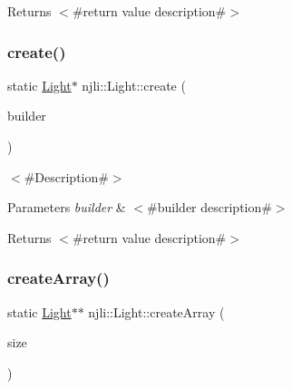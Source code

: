 \begin{DoxyReturn}{Returns}
$<$\#return value description\#$>$ 
\end{DoxyReturn}
\mbox{\label{classnjli_1_1_light_a9f63fa25bf0911636398d7b0d9d91a2f}} 
\subsubsection{\texorpdfstring{create()}{create()}\hspace{0.1cm}{\footnotesize\ttfamily [3/3]}}
{\footnotesize\ttfamily static \mbox{\hyperlink{classnjli_1_1_light}{Light}}$\ast$ njli\+::\+Light\+::create (\begin{DoxyParamCaption}\item[{const \mbox{\hyperlink{classnjli_1_1_light_builder}{Light\+Builder}} \&}]{builder }\end{DoxyParamCaption})\hspace{0.3cm}{\ttfamily [static]}}

$<$\#\+Description\#$>$


\begin{DoxyParams}{Parameters}
{\em builder} & $<$\#builder description\#$>$\\
\hline
\end{DoxyParams}
\begin{DoxyReturn}{Returns}
$<$\#return value description\#$>$ 
\end{DoxyReturn}
\mbox{\label{classnjli_1_1_light_af5480d5e20cc23e6b6396682933b8f7b}} 
\subsubsection{\texorpdfstring{create\+Array()}{createArray()}}
{\footnotesize\ttfamily static \mbox{\hyperlink{classnjli_1_1_light}{Light}}$\ast$$\ast$ njli\+::\+Light\+::create\+Array (\begin{DoxyParamCaption}\item[{const \mbox{\hyperlink{_util_8h_a10e94b422ef0c20dcdec20d31a1f5049}{u32}}}]{size }\end{DoxyParamCaption})\hspace{0.3cm}{\ttfamily [static]}}

